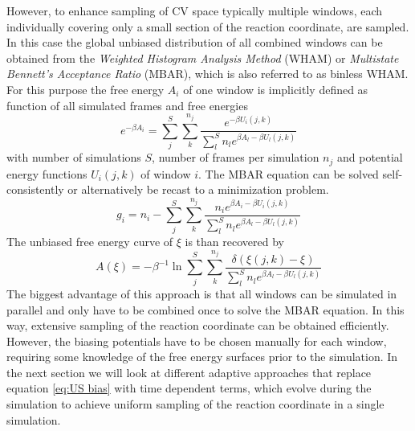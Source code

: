 However, to enhance sampling of CV space typically multiple windows, each individually covering only a small section of the reaction coordinate, are sampled. In this case the global unbiased distribution of all combined windows can be obtained from the \textit{Weighted Histogram Analysis Method} (WHAM)\autocite{souaille2001extension} or \textit{Multistate Bennett's Acceptance Ratio} (MBAR)\autocite{shirts2008statistically}, which is also referred to as binless WHAM.
For this purpose the free energy $A_i$ of one window is implicitly defined as function of all simulated frames and free energies
\begin{equation}
   e^{-\beta A_i} = \sum_j^S \sum_k^{n_j} \frac{e^{-\beta U_i(j,k)}}{\sum_l^S n_l e^{\beta A_l - \beta U_l(j,k)}}
\end{equation}
with number of simulations $S$, number of frames per simulation $n_j$ and potential energy functions $U_i(j,k)$ of window $i$.
The MBAR equation can be solved self-consistently or
alternatively be recast to a minimization problem.
\begin{equation}
  g_i = n_i - \sum_j^S \sum_k^{n_j}  \frac{n_i e^{\beta A_i - \beta U_i(j,k)}}{\sum_l^S n_l e^{\beta A_l - \beta U_l(j,k)}} \label{eq:g}
\end{equation}
The unbiased free energy curve of $\xi$ is than recovered by
\begin{equation}
  A(\xi) = -\beta^{-1} \ln \sum_j^S \sum_k^{n_j} \frac{\delta(\xi(j,k)-\xi)}{\sum_l^S n_l e^{\beta A_l - \beta U_l(j,k)}}
\end{equation}
The biggest advantage of this approach is that all windows can be simulated in parallel and only have to be combined once to solve the MBAR equation. In this way, extensive sampling of the reaction coordinate can be obtained efficiently.
However, the biasing potentials have to be chosen manually for each window, requiring some knowledge of the free energy surfaces prior to the simulation.
In the next section we will look at different adaptive approaches that replace equation \ref{eq:US bias} with time dependent terms, which evolve during the simulation to achieve uniform sampling of the reaction coordinate in a single simulation.

